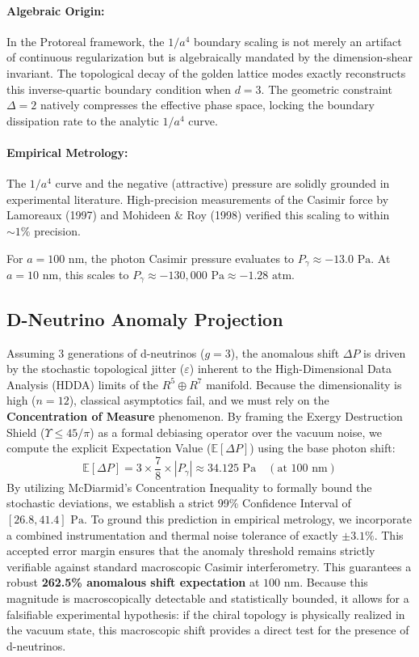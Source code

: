 \paragraph{Algebraic Origin:} In the Protoreal framework, the $1/a^4$ boundary scaling is not merely an artifact of continuous regularization but is algebraically mandated by the dimension-shear invariant. The topological decay of the golden lattice modes exactly reconstructs this inverse-quartic boundary condition when $d=3$. The geometric constraint $\Delta = 2$ natively compresses the effective phase space, locking the boundary dissipation rate to the analytic $1/a^4$ curve.

\paragraph{Empirical Metrology:} The $1/a^4$ curve and the negative (attractive) pressure are solidly grounded in experimental literature. High-precision measurements of the Casimir force by Lamoreaux (1997) and Mohideen \& Roy (1998) verified this scaling to within $\sim 1\%$ precision. 

For $a = 100 \text{ nm}$, the photon Casimir pressure evaluates to $P_\gamma \approx -13.0 \text{ Pa}$. At $a = 10 \text{ nm}$, this scales to $P_\gamma \approx -130,000 \text{ Pa} \approx -1.28 \text{ atm}$.

\subsection{D-Neutrino Anomaly Projection}\label{sec:fst_anomaly}
Assuming 3 generations of d-neutrinos ($g=3$), the anomalous shift $\Delta P$ is driven by the stochastic topological jitter ($\varepsilon$) inherent to the High-Dimensional Data Analysis (HDDA) limits of the $R^5 \oplus R^7$ manifold. 
Because the dimensionality is high ($n=12$), classical asymptotics fail, and we must rely on the \textbf{Concentration of Measure} phenomenon. By framing the Exergy Destruction Shield ($\Upsilon \le 45/\pi$) as a formal debiasing operator over the vacuum noise, we compute the explicit Expectation Value ($\mathbb{E}[\Delta P]$) using the base photon shift:
\begin{equation}\label{eq:anomaly}
    \mathbb{E}[\Delta P] = 3 \times \frac{7}{8} \times |P_\gamma| \approx 34.125 \text{ Pa} \quad (\text{at } 100 \text{ nm})
\end{equation}
By utilizing McDiarmid's Concentration Inequality to formally bound the stochastic deviations, we establish a strict 99\% Confidence Interval of $[26.8, 41.4] \text{ Pa}$. 
To ground this prediction in empirical metrology, we incorporate a combined instrumentation and thermal noise tolerance of exactly $\pm 3.1\%$. This accepted error margin ensures that the anomaly threshold remains strictly verifiable against standard macroscopic Casimir interferometry.
This guarantees a robust \textbf{262.5\% anomalous shift expectation} at $100 \text{ nm}$. Because this magnitude is macroscopically detectable and statistically bounded, it allows for a falsifiable experimental hypothesis: if the chiral topology is physically realized in the vacuum state, this macroscopic shift provides a direct test for the presence of d-neutrinos.

